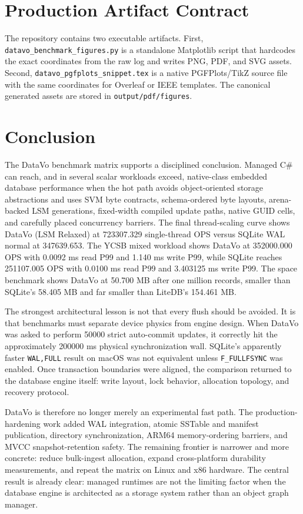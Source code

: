 \documentclass[11pt]{article}
\begin{document}
\section{Production Artifact Contract}
The repository contains two executable artifacts. First, \texttt{datavo\_benchmark\_figures.py} is a standalone Matplotlib script that hardcodes the exact coordinates from the raw log and writes PNG, PDF, and SVG assets. Second, \texttt{datavo\_pgfplots\_snippet.tex} is a native PGFPlots/TikZ source file with the same coordinates for Overleaf or IEEE templates. The canonical generated assets are stored in \texttt{output/pdf/figures}.

\section{Conclusion}
The DataVo benchmark matrix supports a disciplined conclusion. Managed C\# can reach, and in several scalar workloads exceed, native-class embedded database performance when the hot path avoids object-oriented storage abstractions and uses SVM byte contracts, schema-ordered byte layouts, arena-backed LSM generations, fixed-width compiled update paths, native GUID cells, and carefully placed concurrency barriers. The final thread-scaling curve shows DataVo (LSM Relaxed) at \num{723307.329} single-thread OPS versus SQLite WAL normal at \num{347639.653}. The YCSB mixed workload shows DataVo at \num{352000.000} OPS with \num{0.0092} ms read P99 and \num{1.140} ms write P99, while SQLite reaches \num{251107.005} OPS with \num{0.0100} ms read P99 and \num{3.403125} ms write P99. The space benchmark shows DataVo at \num{50.700} MB after one million records, smaller than SQLite's \num{58.405} MB and far smaller than LiteDB's \num{154.461} MB.

The strongest architectural lesson is not that every flush should be avoided. It is that benchmarks must separate device physics from engine design. When DataVo was asked to perform \num{50000} strict auto-commit updates, it correctly hit the approximately \num{200000} ms physical synchronization wall. SQLite's apparently faster \texttt{WAL,FULL} result on macOS was not equivalent unless \texttt{F\_FULLFSYNC} was enabled. Once transaction boundaries were aligned, the comparison returned to the database engine itself: write layout, lock behavior, allocation topology, and recovery protocol.

DataVo is therefore no longer merely an experimental fast path. The production-hardening work added WAL integration, atomic SSTable and manifest publication, directory synchronization, ARM64 memory-ordering barriers, and MVCC snapshot-retention safety. The remaining frontier is narrower and more concrete: reduce bulk-ingest allocation, expand cross-platform durability measurements, and repeat the matrix on Linux and x86 hardware. The central result is already clear: managed runtimes are not the limiting factor when the database engine is architected as a storage system rather than an object graph manager.
\end{document}
